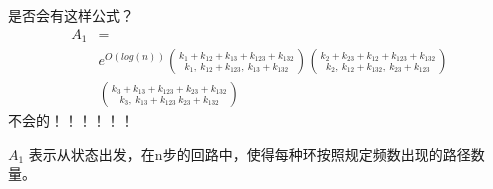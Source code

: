 \documentclass[cn,hazy,egreen,14pt,normal]{elegantnote}
\begin{document}

是否会有这样公式？
\begin{align*}
    A_1 &= \\ 
    &e^{O(log(n))} \binom{k_{1}+k_{12}+k_{13}+k_{123}+k_{132}}{k_{1}, ~k_{12}+k_{123}, ~k_{13}+k_{132}} 
    \binom{k_{2} +k_{23} + k_{12} +k_{123} + k_{132}}{k_{2} ,~k_{12} + k_{132}, ~k_{23} + k_{123}} \\
    &\binom{k_{3} + k_{13} + k_{123} +k_{23} +k_{132}}{k_{3} ,~k_{13} + k_{123} ~k_{23} +k_{132}} 
\end{align*}
不会的！！！！！！


$A_1$ 表示从状态出发，在n步的回路中，使得每种环按照规定频数出现的路径数量。
\end{document}
